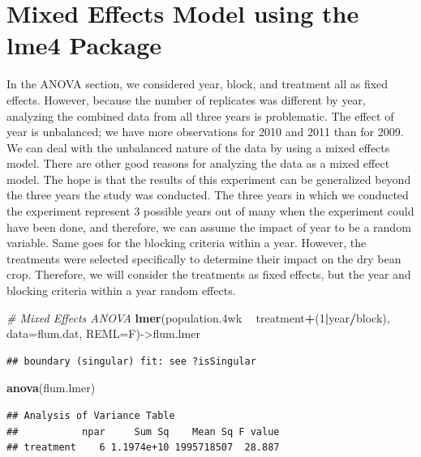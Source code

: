 \documentclass[letterpaper,]{book}
\newenvironment{Shaded}{\begin{snugshade}}{\end{snugshade}}
\newcommand{\CommentTok}[1]{\textcolor[rgb]{0.56,0.35,0.01}{\textit{#1}}}
\newcommand{\DataTypeTok}[1]{\textcolor[rgb]{0.13,0.29,0.53}{#1}}
\newcommand{\DecValTok}[1]{\textcolor[rgb]{0.00,0.00,0.81}{#1}}
\newcommand{\FloatTok}[1]{\textcolor[rgb]{0.00,0.00,0.81}{#1}}
\newcommand{\KeywordTok}[1]{\textcolor[rgb]{0.13,0.29,0.53}{\textbf{#1}}}
\newcommand{\NormalTok}[1]{#1}
\newcommand{\OperatorTok}[1]{\textcolor[rgb]{0.81,0.36,0.00}{\textbf{#1}}}
\newcommand{\StringTok}[1]{\textcolor[rgb]{0.31,0.60,0.02}{#1}}
\begin{document}
\hypertarget{mixed-effects-model-using-the-lme4-package}{%
\section{Mixed Effects Model using the lme4 Package}\label{mixed-effects-model-using-the-lme4-package}}

In the ANOVA section, we considered year, block, and treatment all as fixed effects. However, because the number of replicates was different by year, analyzing the combined data from all three years is problematic. The effect of year is unbalanced; we have more observations for 2010 and 2011 than for 2009. We can deal with the unbalanced nature of the data by using a mixed effects model. There are other good reasons for analyzing the data as a mixed effect model. The hope is that the results of this experiment can be generalized beyond the three years the study was conducted. The three years in which we conducted the experiment represent 3 possible years out of many when the experiment could have been done, and therefore, we can assume the impact of year to be a random variable. Same goes for the blocking criteria within a year. However, the treatments were selected specifically to determine their impact on the dry bean crop. Therefore, we will consider the treatments as fixed effects, but the year and blocking criteria within a year random effects.

\begin{Shaded}
\begin{Highlighting}[]
\CommentTok{# Mixed Effects ANOVA}
\KeywordTok{lmer}\NormalTok{(population}\FloatTok{.4}\NormalTok{wk }\OperatorTok{~}\StringTok{ }\NormalTok{treatment}\OperatorTok{+}\NormalTok{(}\DecValTok{1}\OperatorTok{|}\NormalTok{year}\OperatorTok{/}\NormalTok{block), }\DataTypeTok{data=}\NormalTok{flum.dat, }\DataTypeTok{REML=}\NormalTok{F)->flum.lmer}
\end{Highlighting}
\end{Shaded}

\begin{verbatim}
## boundary (singular) fit: see ?isSingular
\end{verbatim}

\begin{Shaded}
\begin{Highlighting}[]
\KeywordTok{anova}\NormalTok{(flum.lmer)}
\end{Highlighting}
\end{Shaded}

\begin{verbatim}
## Analysis of Variance Table
##           npar     Sum Sq    Mean Sq F value
## treatment    6 1.1974e+10 1995718507  28.887
\end{verbatim}
\end{document}
